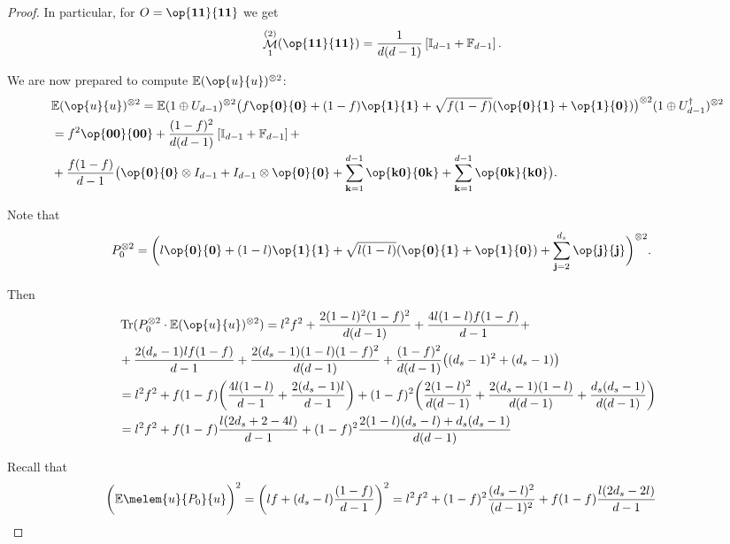 \documentclass[pra,twocolumn,superscriptaddress,longbibliography]{revtex4-2}
\theoremstyle{remark}
\newcommand{\mcl}{\mathcal}
\newcommand{\mbb}{\mathbb}
\DeclareMathOperator{\tr}{Tr}
\DeclareMathOperator{\mom}{\mcl{M}}
\numberwithin{equation}{section}
\begin{document}
\begin{proof}
In particular, for $O = \op{\bf 11}{\bf 11}$ we get 
\begin{align*}
& \mom_1^{(2)}(\op{\bf 11}{\bf 11})
= \frac{1}{d(d-1)}\left[\mbb{I}_{d-1} + \mbb{F}_{d-1}\right].
\end{align*}

We are now prepared to compute $\mbb{E}(\op{u}{u})^{\otimes2}$:  
\begin{align*}
& \mbb{E}(\op{u}{u})^{\otimes2}
= \mbb{E}(1\oplus{U}_{d-1})^{\otimes2}
\big(f\op{\bf 0}{\bf 0} + (1-f)\op{\bf 1}{\bf 1} + \sqrt{f(1-f)}(\op{\bf 0}{\bf 1} + \op{\bf 1}{\bf 0})\big)^{\otimes2}
(1\oplus{U}_{d-1}^\dagger)^{\otimes2} \\
& = f^2\op{\bf 00}{\bf 00} 
+ \frac{(1-f)^2}{d(d-1)}\left[\mbb{I}_{d-1} + \mbb{F}_{d-1}\right] + \\
& + \frac{f(1-f)}{d-1}\big(\op{\bf 0}{\bf 0} \otimes I_{d-1} + I_{d-1} \otimes \op{\bf 0}{\bf 0} 
+ \sum_{{\bf k}=1}^{d-1}\op{\bf k0}{\bf 0k} + \sum_{{\bf k}=1}^{d-1}\op{\bf 0k}{\bf k0}\big).
\end{align*}

Note that 
\begin{align*}
& P_0^{\otimes2} 
= \bigg(l\op{\bf 0}{\bf 0} + (1-l)\op{\bf 1}{\bf 1} + \sqrt{l(1-l)}(\op{\bf 0}{\bf 1}+\op{\bf 1}{\bf 0}) 
    + \sum_{{\bf j}=2}^{d_s}\op{\bf j}{\bf j} \bigg)^{\otimes2}.
\end{align*}

Then 
\begin{align*}
& \tr(P_0^{\otimes2} \cdot \mbb{E}(\op{u}{u})^{\otimes2}) 
= l^2f^2 + \frac{2(1-l)^2(1-f)^2}{d(d-1)} + \frac{4l(1-l)f(1-f)}{d-1} + \\
& + \frac{2(d_s-1)lf(1-f)}{d-1} + \frac{2(d_s-1)(1-l)(1-f)^2}{d(d-1)} 
+ \frac{(1-f)^2}{d(d-1)}\big( (d_s-1)^2 + (d_s-1)\big) \\
& = l^2f^2 + f(1-f)\bigg(\frac{4l(1-l)}{d-1} + \frac{2(d_s-1)l}{d-1} \bigg) 
+ (1-f)^2\bigg(\frac{2(1-l)^2}{d(d-1)} + \frac{2(d_s-1)(1-l)}{d(d-1)} + \frac{d_s(d_s-1)}{d(d-1)}\bigg) \\
& = l^2f^2 + f(1-f)\frac{l(2d_s+2-4l)}{d-1}
+ (1-f)^2\frac{2(1-l)(d_s-l) + d_s(d_s-1)}{d(d-1)}
\end{align*}

Recall that 
\begin{align*}
& \bigg({\mbb{E}}\melem{u}{P_0}{u}\bigg)^2
= \bigg(lf + (d_s-l)\frac{(1-f)}{d-1} \bigg)^2 
= l^2f^2 + (1-f)^2\frac{(d_s-l)^2}{(d-1)^2} + f(1-f)\frac{l(2d_s-2l)}{d-1}
\end{align*}


\end{proof}
\end{document}
